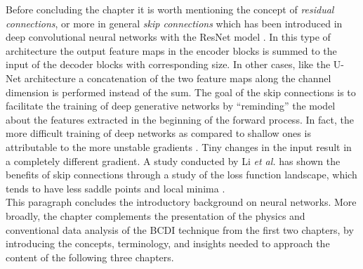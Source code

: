 Before concluding the chapter it is worth mentioning the concept of \textit{residual connections}, or more in 
general \textit{skip connections} which has been introduced in deep convolutional neural networks with the ResNet model 
\cite{he2015deepresiduallearningimage}. In this type of architecture the output feature maps in the encoder blocks
is summed to the input of the decoder blocks with corresponding size. In other cases, like the U-Net architecture 
\cite{ronneberger_u-net_2015} a concatenation of the two feature maps along the channel dimension is performed instead 
of the sum. The goal of the skip connections is to facilitate the training of deep generative networks by ``reminding'' 
the model about the features extracted in the beginning of the forward process. In fact, the more difficult training 
of deep networks as compared to shallow ones is attributable to the more unstable gradients \cite{balduzzi2018}. Tiny 
changes in the input result in a completely different gradient. A study conducted by Li \textit{et al.} has shown 
the benefits of skip connections through a study of the loss function landscape, which tends to have less saddle points 
and local minima \cite{li_visualizing_2017}. \\

This paragraph concludes the introductory background on neural networks. More broadly, the chapter complements the 
presentation of the physics and conventional data analysis of the BCDI technique from the first two chapters, by 
introducing the concepts, terminology, and insights needed to approach the content of the following three chapters.

